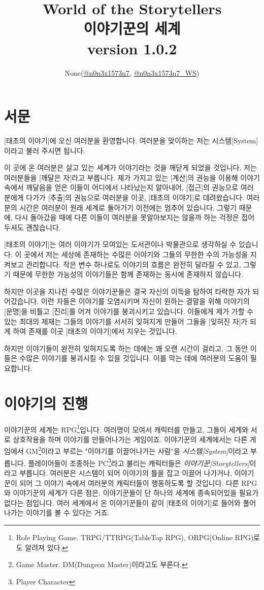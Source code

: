 \documentclass[12pt]{report}
\title{
	World of the Storytellers\\
	이야기꾼의 세계\\
	\large version 1.0.2
}
\author{None(\href{https://www.twitter.com/n0n3x1573n7}{@n0n3x1573n7}, \href{https://www.twitter.com/n0n3x1573n7_WS}{@n0n3x1573n7\_WS})}
\date{}
\newcommand{\world}[1]{{\nanumpen \large #1 \par}\bigskip}
\begin{document}
	\maketitle
	
	\tableofcontents
	
	\chapter{서문}
	\world{[태초의 이야기]에 오신 여러분을 환영합니다. 여러분을 맞이하는 저는 시스템[System]이라고 불러 주시면 됩니다.}
	\world{이 곳에 온 여러분은 살고 있는 세계가 이야기라는 것을 깨닫게 되었을 것입니다. 저는 여러분들을 [깨달은 자]라고 부릅니다. 제가 가지고 있는 [계산]의 권능을 이용해 이야기 속에서 깨달음을 얻은 이들이 어디에서 나타났는지 알아내어, [접근]의 권능으로 여러분에게 다가가 [추출]의 권능으로 여러분을 이곳, [태초의 이야기]로 데려왔습니다. 여러분의 시간은 여러분이 원래 세계로 돌아가기 이전에는 멈추어 있습니다. 그렇기 때문에, 다시 돌아갔을 때에 다른 이들이 여러분을 못알아보지는 않을까 하는 걱정은 접어두셔도 괜찮습니다.}
	\world{[태초의 이야기]는 여러 이야기가 모여있는 도서관이나 박물관으로 생각하실 수 있습니다. 이 곳에서 저는 세상에 존재하는 수많은 이야기와 그들의 무한한 수의 가능성을 지켜보고 관리합니다. 작은 변수 하나로도 이야기의 흐름은 완전히 달라질 수 있고, 그렇기 때문에 무한한 가능성의 이야기들은 함께 존재하는 동시에 존재하지 않습니다.}
	\world{하지만 이곳을 지나친 수많은 이야기꾼들은 결국 자신의 이득을 탐하여 타락한 자가 되어갔습니다. 이런 자들은 이야기를 오염시키며 자신이 원하는 결말을 위해 이야기의 [운명]을 비틀고 [진리]를 어겨 이야기를 붕괴시키고 있습니다. 이들에게 제가 가할 수 있는 최대의 제재는 그들의 이야기를 서서히 잊혀지게 만들어 그들을 [잊혀진 자]가 되게 하여 존재를 이곳 [태초의 이야기]에서 지우는 것입니다.}
	\world{하지만 이야기들이 완전히 잊혀지도록 하는 데에는 꽤 오랜 시간이 걸리고, 그 동안 이들은 수많은 이야기를 붕괴시킬 수 있을 것입니다. 이를 막는 데에 여러분의 도움이 필요합니다.}
	
	\chapter{이야기의 진행}
	
	이야기꾼의 세계는 RPG\footnote{Role Playing Game. TRPG/TTRPG(TableTop RPG), ORPG(Online RPG)로도 알려져 있다.}입니다. 여러명이 모여서 캐릭터를 만들고, 그들이 세계와 서로 상호작용을 하며 이야기를 만들어나가는 게임이죠. 이야기꾼의 세계에서는 다른 게임에서 GM\footnote{Game Master. DM(Dungeon Master)이라고도 부른다.}이라고 부르는 "이야기를 이끌어나가는 사람"을 \emph{시스템[System]}이라고 부릅니다. 플레이어들이 조종하는 PC\footnote{Player Character}라고 불리는 캐릭터들은 \emph{이야기꾼[Storytellers]}이라고 부릅니다. 여러분은 시스템이 되어 이야기의 틀을 잡고 이끌어 나가거나, 이야기꾼이 되어 그 이야기 속에서 여러분의 캐릭터들이 행동하도록 할 것입니다.
	다른 RPG와 이야기꾼의 세계가 다른 점은, 이야기꾼들이 단 하나의 세계에 종속되어있을 필요가 없다는 점입니다. 여러 세계에서 온 이야기꾼들이 같이 [태초의 이야기]로 들어와 풀어나가는 이야기를 볼 수 있다는 거죠.
	
\end{document}
